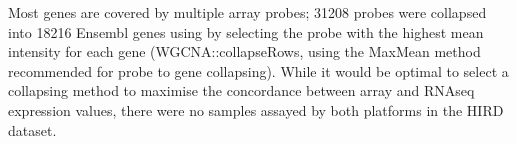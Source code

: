Most genes are covered by multiple array probes; 31208 probes were collapsed into 18216 Ensembl genes using by selecting the probe with the highest mean intensity for each gene (WGCNA::collapseRows, using the MaxMean method recommended for probe to gene collapsing)\autocite{miller2011StrategiesAggregatingGene}.
While it would be optimal to select a collapsing method to maximise the concordance between array and \gls{RNAseq} expression values, there were no samples assayed by both platforms in the \gls{HIRD} dataset.

%

\subsection{}

